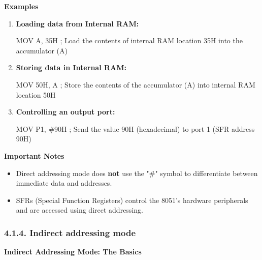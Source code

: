 \documentclass[
]{article}
\newenvironment{Shaded}{}{}
\newcommand{\NormalTok}[1]{#1}
\begin{document}
\textbf{Examples}

\begin{enumerate}
\def\labelenumi{\arabic{enumi}.}
\item
  \textbf{Loading data from Internal RAM:}

\begin{Shaded}
\begin{Highlighting}[]
\NormalTok{MOV A, 35H  ; Load the contents of internal RAM location 35H into the accumulator (A)}
\end{Highlighting}
\end{Shaded}
\item
  \textbf{Storing data in Internal RAM:}

\begin{Shaded}
\begin{Highlighting}[]
\NormalTok{MOV 50H, A  ; Store the contents of the accumulator (A) into internal RAM location 50H}
\end{Highlighting}
\end{Shaded}
\item
  \textbf{Controlling an output port:}

\begin{Shaded}
\begin{Highlighting}[]
\NormalTok{MOV P1, \#90H ; Send the value 90H (hexadecimal) to port 1 (SFR address 90H)}
\end{Highlighting}
\end{Shaded}
\end{enumerate}

\textbf{Important Notes}

\begin{itemize}
\item
  Direct addressing mode does \textbf{not} use the "\#" symbol to
  differentiate between immediate data and addresses.
\item
  SFRs (Special Function Registers) control the 8051's hardware
  peripherals and are accessed using direct addressing.
\end{itemize}

\hypertarget{414-indirect-addressing-mode}{%
\subsubsection{4.1.4. Indirect addressing
mode}\label{414-indirect-addressing-mode}}

\textbf{Indirect Addressing Mode: The Basics}
\end{document}

